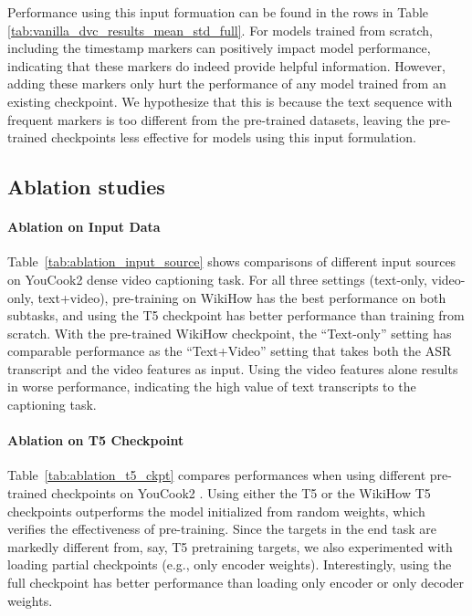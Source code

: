 \documentclass[11pt]{article}
\begin{document}
Performance using this input formuation can be found in the \timeanchorShort rows in Table \ref{tab:vanilla_dvc_results_mean_std_full}.
For models trained from scratch, including the timestamp markers can positively impact model performance, indicating that these markers do indeed provide helpful information. However, adding these markers only hurt the performance of any model trained from an existing checkpoint. We hypothesize that this is because the text sequence with frequent markers is too different from the pre-trained datasets, leaving the pre-trained checkpoints less effective for models using this input formulation.

\subsection{Ablation studies}
\label{sec:appendix:ablation}

\paragraph{Ablation on Input Data}
Table~\ref{tab:ablation_input_source} shows comparisons of different input sources on YouCook2 dense video captioning task. For all three settings (text-only, video-only, text+video), pre-training on WikiHow has the best performance on both subtasks, and using the T5 checkpoint has better performance than training from scratch. With the pre-trained WikiHow checkpoint, the ``Text-only'' setting has comparable performance as the ``Text+Video'' setting that takes both the ASR transcript and the video features as input. Using the video features alone results in worse performance, indicating the high value of text transcripts to the captioning task.





\paragraph{Ablation on T5 Checkpoint}

Table~\ref{tab:ablation_t5_ckpt} compares performances when using different pre-trained checkpoints on YouCook2 \partitiontask. Using either the T5 or the WikiHow T5 checkpoints outperforms the model initialized from random weights, which verifies the effectiveness of pre-training. Since the targets in the end task are markedly different from, say, T5 pretraining targets, we also experimented with loading partial checkpoints (e.g., only encoder weights). Interestingly, using the full checkpoint has better performance than loading only encoder or only decoder weights.
\end{document}
